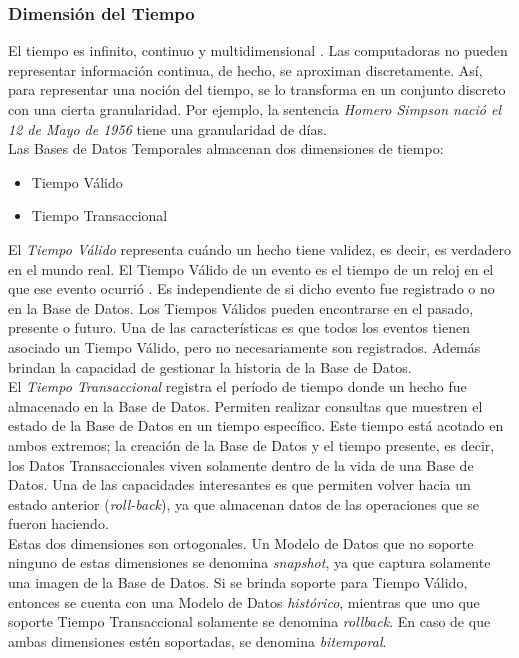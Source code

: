 \documentclass[a4paper,12pt,oneside]{report}
\begin{document}
\subsubsection*{Dimensi\'on del Tiempo}
El tiempo es infinito, continuo y multidimensional \cite{snodgrass86}. Las computadoras no pueden representar informaci\'on continua, de hecho, se aproximan discretamente. As\'i, para representar una noci\'on del tiempo, se lo transforma en un conjunto discreto con una cierta granularidad. Por ejemplo, la sentencia \textit{Homero Simpson naci\'o el 12 de Mayo de 1956} tiene una granularidad de d\'ias.\\ 
Las Bases de Datos Temporales almacenan dos dimensiones de tiempo:
\begin{itemize}
\item Tiempo V\'alido
\item Tiempo Transaccional
\end{itemize}
El \textit{Tiempo V\'alido} representa cu\'ando un hecho tiene validez, es decir, es verdadero en el mundo real. El Tiempo V\'alido de un evento es el tiempo de un reloj en el que ese evento ocurri\'o \cite{snodgrass86}. Es independiente de si dicho evento fue registrado o no en la Base de Datos. Los Tiempos V\'alidos pueden encontrarse en el pasado, presente o futuro. Una de las caracter\'isticas es que todos los eventos tienen asociado un Tiempo V\'alido, pero no necesariamente son registrados. Adem\'as brindan la capacidad de gestionar la historia de la Base de Datos.\\
El \textit{Tiempo Transaccional} registra el per\'iodo de tiempo donde un hecho fue almacenado en la Base de Datos. Permiten realizar consultas que muestren el estado de la Base de Datos en un tiempo espec\'ifico. Este tiempo est\'a acotado en ambos extremos; la creaci\'on de la Base de Datos y el tiempo presente, es decir, los Datos Transaccionales viven solamente dentro de la vida de una Base de Datos. Una de las capacidades interesantes es que permiten volver hacia un estado anterior (\textit{roll-back}), ya que almacenan datos de las operaciones que se fueron haciendo.\\
Estas dos dimensiones son ortogonales. Un Modelo de Datos que no soporte ninguno de estas dimensiones se denomina \textit{snapshot}, ya que captura solamente una imagen de la Base de Datos. Si se brinda soporte para Tiempo V\'alido, entonces se cuenta con una Modelo de Datos \textit{hist\'orico}, mientras que uno que soporte Tiempo Transaccional solamente se denomina \textit{rollback}. En caso de que ambas dimensiones est\'en soportadas, se denomina \textit{bitemporal}.
\end{document}
